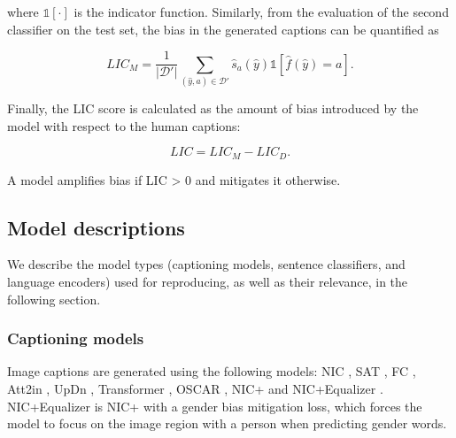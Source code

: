 where $\mathbb{1}[\cdot]$ is the indicator function. Similarly, from the evaluation of the second classifier on the test set, the bias in the generated captions can be quantified as 

\begin{equation}
    LIC_M = \frac{1}{|\mathcal{D'}|} \sum_{(\hat{y},a) \in \mathcal{D'}} \hat{s}_a (\hat{y}) \mathbb{1}[\hat{f}(\hat{y}) = a].
\end{equation}

Finally, the LIC score is calculated as the amount of bias introduced by the model with respect to the human captions:

\begin{equation}
    LIC = LIC_M - LIC_D.
\end{equation}

A model amplifies bias if LIC > 0 and mitigates it otherwise.

\subsection{Model descriptions}
We describe the model types (captioning models, sentence classifiers, and language encoders) used for reproducing, as well as their relevance,  in the following section.

\vspace*{-0.4cm}
\subsubsection{Captioning models}
Image captions are generated using the following models: NIC \cite{nic}, SAT \cite{sat}, FC \cite{fc-att2in}, Att2in \cite{fc-att2in}, UpDn \cite{updn}, Transformer \cite{transformer}, OSCAR \cite{oscar}, NIC+ and NIC+Equalizer \cite{nic-plus}. NIC+Equalizer is NIC+ with a gender bias mitigation loss, which forces the model to focus on the image region with a person when predicting gender words. 


